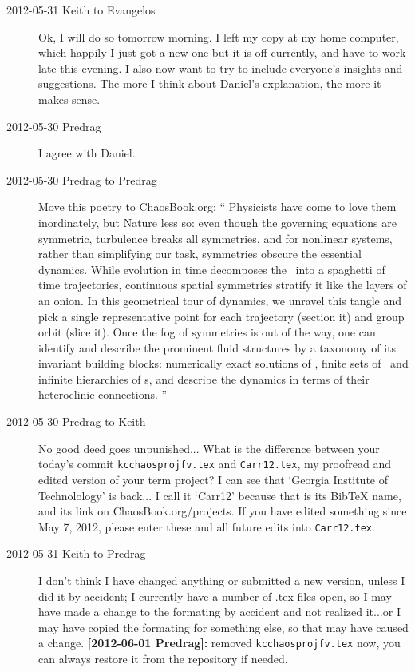 \begin{description}
\item[2012-05-31 Keith to Evangelos] Ok, I will do so tomorrow morning.
I left my copy at my home computer, which happily I just got a new one
but it is off currently, and have to work late this evening.  I also now
want to try to include everyone's insights and suggestions.  The more I
think about Daniel's explanation, the more it makes sense.

\item[2012-05-30 Predrag] I agree with Daniel.

\item[2012-05-30 Predrag  to Predrag]             \toCB
Move this poetry to ChaosBook.org:
``
Physicists have come to love them inordinately, but Nature less so: even
though the governing equations are symmetric, turbulence breaks all
symmetries, and for nonlinear systems, rather than simplifying our task,
symmetries obscure the essential dynamics.
While evolution in time decomposes the \statesp\ into a spaghetti of time
trajectories, continuous spatial symmetries stratify it like the layers
of an onion. In this geometrical tour of dynamics, we unravel this tangle
and pick a single representative point for each trajectory (section it)
and  group orbit (slice it). Once the fog of symmetries is out of the
way, one can identify and describe the prominent fluid structures by a
taxonomy of its invariant building blocks: numerically exact solutions of
\NSe, finite sets of \reqva\ and infinite hierarchies of \rpo s, and
describe the dynamics in terms of their heteroclinic connections.
''

\item[2012-05-30 Predrag  to Keith] No good deed goes unpunished... What
is the difference between your today's commit \texttt{kcchaosprojfv.tex}
and \texttt{Carr12.tex}, my {\color{red}proofread} and edited version of
your term project? I can see that `Georgia Institute of Technolology' is
back... I call it `Carr12' because that is its BibTeX name, and its link
on ChaosBook.org/projects. If you have edited something since May 7,
2012, please enter these and all future edits into \texttt{Carr12.tex}.

\item[2012-05-31 Keith to Predrag]  I don't think I have changed anything
or submitted a new version, unless I did it by accident; I currently have
a number of .tex files open, so I may have made a change to the formating
by accident and not realized it...or I may have copied the formating for
something else, so that may have caused a change.
{\bf [2012-06-01 Predrag]:} removed \texttt{kcchaosprojfv.tex} now, you
can always restore it from the repository if needed.


\end{description}
